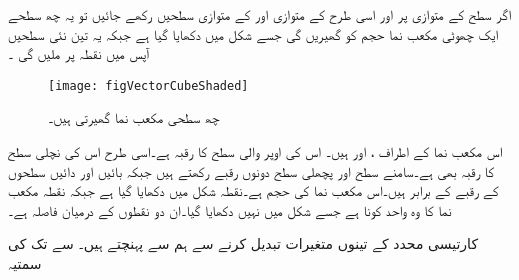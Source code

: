 اگر سطح   کے متوازی  پر اور اسی طرح  کے متوازی  اور  کے متوازی  سطحیں رکھے جائیں تو یہ چھ سطحے ایک چھوٹی  مکعب نما حجم  کو گھیریں گی جسے شکل  میں دکھایا گیا ہے جبکہ یہ تین نئی سطحیں آپس میں نقطہ  پر ملیں گی ۔
\begin{figure}
\centering
\texttt{[image: figVectorCubeShaded]}
\caption{چھ سطحی مکعب نما گھیرتی ہیں۔}
\label{شکل_سمتیہ_کارتیسی_چھوٹی_مکعب}
\end{figure}
اس مکعب نما کے اطراف ،  اور  ہیں۔ اس کی اوپر والی سطح کا رقبہ  ہے۔اسی طرح اس کی نچلی سطح کا رقبہ بھی  ہے۔سامنے سطح  اور پچھلی سطح دونوں  رقبے رکھتے ہیں جبکہ بائیں  اور دائیں سطحوں کے رقبے  کے برابر ہیں۔اس مکعب نما کی حجم  ہے۔نقطہ  شکل میں دکھایا گیا ہے جبکہ
 نقطہ  مکعب نما کا وہ واحد کونا ہے جسے شکل میں نہیں دکھایا گیا۔ان دو نقطوں کے درمیان فاصلہ  ہے۔ 

کارتیسی محدد کے تینوں متغیرات تبدیل کرنے سے ہم  سے  پہنچتے ہیں۔ سے  تک کی سمتیہ

